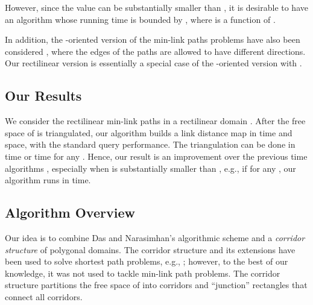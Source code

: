 \documentclass[english,runningheads,11pt]{llncs-revised}
\begin{document}
However, since the value  can be substantially smaller than
, it is desirable to have an
algorithm whose running time is bounded by , where 
is a function of .


In addition, the -oriented version of the min-link paths problems have also been
considered \cite{ref:AdegeestMi94,ref:HershbergerCo94,ref:MitchellMi14},
where the edges of the paths are allowed to have 
different directions. Our rectilinear version is essentially a special
case of the -oriented version with .
	



\subsection{Our Results}
We consider the rectilinear min-link paths in a rectilinear domain .
After the free space of  is triangulated,
our algorithm builds a link distance map in
 time and  space, with the standard query performance.
The triangulation can be done
in  time or 
time for any  \cite{ref:Bar-YehudaTr94}.
Hence, our result is an improvement over the previous 
time algorithms \cite{ref:DasGe91,ref:MitchellMi14,ref:SatoA87}, especially
 when  is substantially smaller than , e.g., if  for any
, our algorithm runs in  time.







\subsection{Algorithm Overview}
Our idea is to combine Das and
Narasimhan's algorithmic scheme
\cite{ref:DasGe91} and a {\em corridor structure} of polygonal
domains.  The corridor structure and its extensions have been used to solve
shortest path problems, e.g.,
\cite{ref:ChenTw14,ref:ChenA11ESA,ref:KapoorAn97,ref:MitchellSe95};
however, to the best of our knowledge, it was not used to tackle
min-link path problems. The corridor structure partitions the free
space of  into  corridors and  ``junction''
rectangles that connect all corridors.
\end{document}
